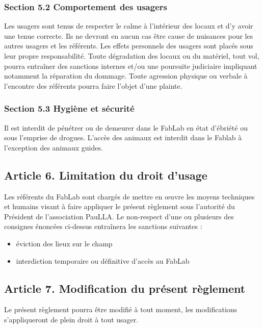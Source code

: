 \subsubsection*{Section 5.2 Comportement des usagers}
Les usagers sont tenus de respecter le calme à l'intérieur des locaux et d'y avoir une tenue correcte. Ils ne devront en aucun cas être cause de nuisances pour les autres usagers et les référents.
Les effets personnels des usagers sont placés sous leur propre responsabilité.
Toute dégradation des locaux ou du matériel, tout vol, pourra entraîner des sanctions internes et/ou une poursuite judiciaire impliquant notamment la réparation du dommage.
Toute agression physique ou verbale à l'encontre des référents pourra faire l'objet d'une plainte.
\subsubsection*{Section 5.3 Hygiène et sécurité}
Il est interdit de pénétrer ou de demeurer dans le FabLab en état d'ébriété ou sous l'emprise de drogues.
L'accès des animaux est interdit dans le Fablab à l'exception des animaux guides.

\subsection*{Article 6. Limitation du droit d'usage}
Les référents du FabLab sont chargés de mettre en œuvre les moyens techniques et humains visant à faire appliquer le présent règlement sous l'autorité du Président de l'association PauLLA.
Le non-respect d'une ou plusieurs des consignes énoncées ci-dessus entraînera les sanctions suivantes :
\begin{itemize}
  \item éviction des lieux sur le champ
  \item interdiction temporaire ou définitive d'accès au FabLab
\end{itemize}

\subsection*{Article 7. Modification du présent règlement}
Le présent règlement pourra être modifié à tout moment, les modifications s'appliqueront de plein droit à tout usager.
